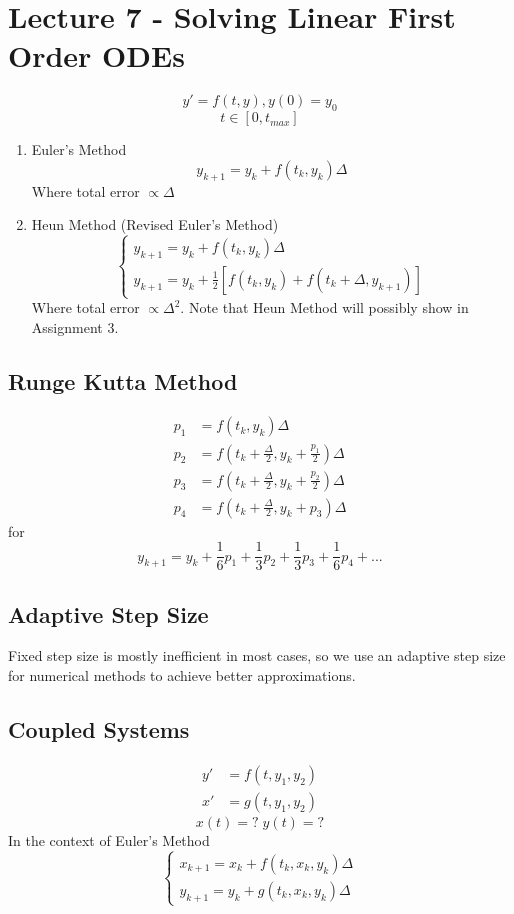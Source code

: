 \documentclass[a6paper]{article}
\theoremstyle{definition}
\theoremstyle{plain}
\theoremstyle{remark}
\begin{document}
\section{Lecture 7 - Solving Linear First Order ODEs}
\[y' = f(t,y), y(0) = y_0\]
\[t \in [0,t_{max}]\]

\begin{enumerate}
      \item Euler's Method
      \[y_{k+1} = y_k + f(t_k, y_k) \Delta\]
      Where total error \( \propto \Delta\)
      \item Heun Method (Revised Euler's Method)
      \[\begin{cases}
            y_{k+1} = y_k + f(t_k, y_k) \Delta \\
            y_{k+1} = y_k + \frac{1}{2} [f(t_k, y_k) + f(t_k + \Delta, y_{k+1})]
      \end{cases}\]
      Where total error \(\propto \Delta^2\). Note that Heun Method will possibly show in
      Assignment 3.
\end{enumerate}
\subsection{Runge Kutta Method}
\begin{align*}
      p_1 &= f(t_k, y_k) \Delta\\
      p_2 &= f(t_k + \frac{\Delta}{2}, y_k + \frac{p_1}{2})\Delta\\
      p_3 &= f(t_k + \frac{\Delta}{2}, y_k + \frac{p_2}{2})\Delta\\
      p_4 &= f(t_k + \frac{\Delta}{2}, y_k + p_3) \Delta
\end{align*}
for \[y_{k+1} = y_k + \frac{1}{6} p_1 + \frac{1}{3} p_2 + \frac{1}{3} p_3 + \frac{1}{6}p_4 + ...\]
\subsection{Adaptive Step Size}
Fixed step size is mostly inefficient in most cases, so we use an adaptive step size
for numerical methods to achieve better approximations.

\subsection{Coupled Systems}
\begin{align*}
      y' &= f(t,y_1, y_2) \\
      x' &= g(t, y_1, y_2) 
\end{align*}
\[x(t) = ? \; y(t) = ?\]
In the context of Euler's Method
\[\begin{cases}
      x_{k+1} = x_k + f(t_k , x_k, y_k)\Delta\\
      y_{k+1} = y_k + g(t_k, x_k, y_k)\Delta
\end{cases}\]
\end{document}
